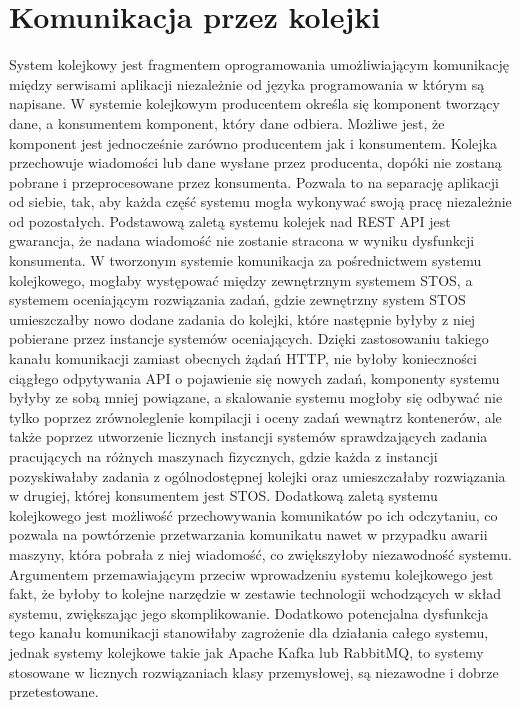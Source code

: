\section{Komunikacja przez kolejki}
System kolejkowy jest fragmentem oprogramowania umożliwiającym komunikację między serwisami aplikacji niezależnie od języka programowania w którym są napisane. W systemie kolejkowym producentem określa się komponent tworzący dane, a konsumentem komponent, który dane odbiera. Możliwe jest, że komponent jest jednocześnie zarówno producentem jak i konsumentem. Kolejka przechowuje wiadomości lub dane wysłane przez producenta, dopóki nie zostaną pobrane i przeprocesowane przez konsumenta. Pozwala to na separację aplikacji od siebie, tak, aby każda część systemu mogła wykonywać swoją pracę niezależnie od pozostałych. Podstawową zaletą systemu kolejek nad REST API jest gwarancja, że nadana wiadomość nie zostanie stracona w wyniku dysfunkcji konsumenta. W tworzonym systemie komunikacja za pośrednictwem systemu kolejkowego, mogłaby występować między zewnętrznym systemem STOS, a systemem oceniającym rozwiązania zadań, gdzie zewnętrzny system STOS umieszczałby nowo dodane zadania do kolejki, które następnie byłyby z niej pobierane przez instancje systemów oceniających. Dzięki zastosowaniu takiego kanału komunikacji zamiast obecnych żądań HTTP, nie byłoby konieczności ciągłego odpytywania API o pojawienie się nowych zadań, komponenty systemu byłyby ze sobą mniej powiązane, a skalowanie systemu mogłoby się odbywać nie tylko poprzez zrównoleglenie kompilacji i oceny zadań wewnątrz kontenerów, ale także poprzez utworzenie licznych instancji systemów sprawdzających zadania pracujących na różnych maszynach fizycznych, gdzie każda z instancji pozyskiwałaby zadania z ogólnodostępnej kolejki oraz umieszczałaby rozwiązania w drugiej, której konsumentem jest STOS. Dodatkową zaletą systemu kolejkowego jest możliwość przechowywania komunikatów po ich odczytaniu, co pozwala na powtórzenie przetwarzania komunikatu nawet w przypadku awarii maszyny, która pobrała z niej wiadomość, co zwiększyłoby niezawodność systemu. Argumentem przemawiającym przeciw wprowadzeniu systemu kolejkowego jest fakt, że byłoby to kolejne narzędzie w zestawie technologii wchodzących w skład systemu, zwiększając jego skomplikowanie. Dodatkowo potencjalna dysfunkcja tego kanału komunikacji stanowiłaby zagrożenie dla działania całego systemu, jednak systemy kolejkowe takie jak Apache Kafka lub RabbitMQ, to systemy stosowane w licznych rozwiązaniach klasy przemysłowej, są niezawodne i dobrze przetestowane.
